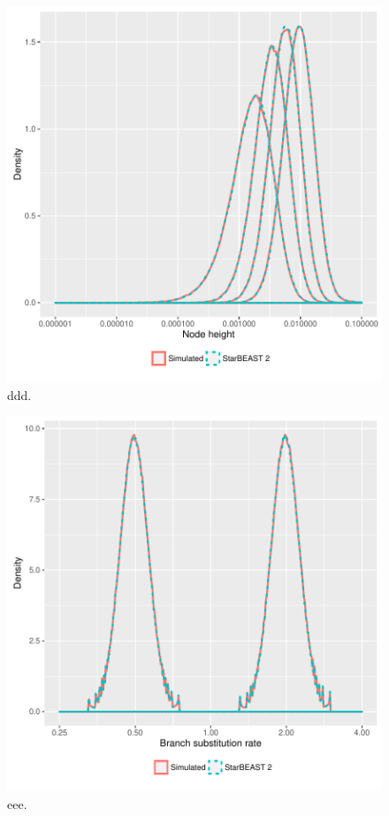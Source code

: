 \documentclass[12pt]{article}
\begin{document}
\clearpage

\begin{figure}[htb!]
\centering
\includegraphics[width=16cm]{gene_node_heights.pdf}
\caption
{ddd.}
\label{fig:geneNodeHeights}
\end{figure}

\clearpage

\begin{figure}[htb!]
\centering
\includegraphics[width=16cm]{gene_branch_rates.pdf}
\caption
{eee.}
\label{fig:geneBranchRates}
\end{figure}

\clearpage
\end{document}
